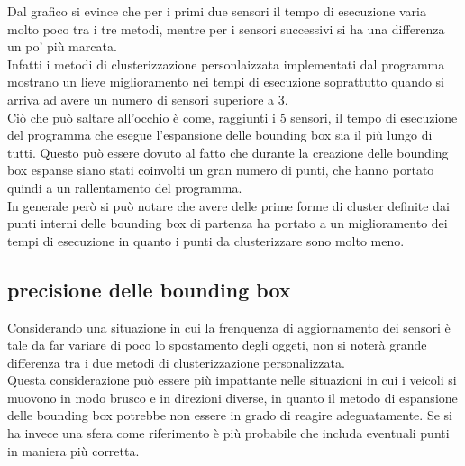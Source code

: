 \documentclass[italian]{article}
\begin{document}
Dal grafico si evince che per i primi due sensori il tempo di esecuzione varia molto poco tra i tre metodi, mentre per i sensori successivi si ha una differenza un po' più marcata.\\
Infatti i metodi di clusterizzazione personlaizzata implementati dal programma mostrano un lieve miglioramento nei tempi di esecuzione soprattutto quando si arriva ad avere un numero di sensori superiore a 3.\\ 
Ciò che può saltare all'occhio è come, raggiunti i 5 sensori, il tempo di esecuzione del programma che esegue l'espansione delle bounding box sia il più lungo di tutti. Questo può essere dovuto al fatto che durante la creazione delle bounding box espanse siano stati coinvolti un gran numero di punti, che hanno portato quindi a un rallentamento del programma.\\
In generale però si può notare che avere delle prime forme di cluster definite dai punti interni delle bounding box di partenza ha portato a un miglioramento dei tempi di esecuzione in quanto i punti da clusterizzare sono molto meno.
\subsection{precisione delle bounding box}
Considerando una situazione in cui la frenquenza di aggiornamento dei sensori è tale da far variare di poco lo spostamento degli oggeti, non si noterà grande differenza tra i due metodi di clusterizzazione personalizzata.\\
Questa considerazione può essere più impattante nelle situazioni in cui i veicoli si muovono in modo brusco e in direzioni diverse, in quanto il metodo di espansione delle bounding box potrebbe non essere in grado di reagire adeguatamente. Se si ha invece una sfera come riferimento è più probabile che includa eventuali punti in maniera più corretta.\\

\newpage
\end{document}
